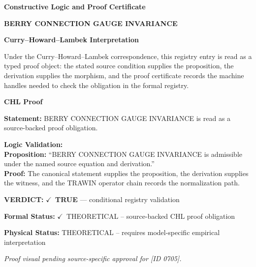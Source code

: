 \clearpage
\begingroup\tzpsupportsetup
\noindent\textbf{\fontsize{10.8pt}{12.8pt}\selectfont [ID 0705] Constructive Logic and Proof Certificate}\par
\noindent\textbf{\fontsize{10pt}{12pt}\selectfont BERRY CONNECTION GAUGE INVARIANCE}\par
\vspace{0.45em}
\begingroup
\footnotesize
\setlength{\parskip}{0.22em}
\setlength{\parindent}{0pt}
\noindent\textbf{Curry--Howard--Lambek Interpretation}\par
Under the Curry--Howard--Lambek correspondence, this registry entry is read as a typed proof
object: the stated source condition supplies the proposition, the derivation supplies the
morphism, and the proof certificate records the machine handles needed to check the obligation
in the formal registry.

\vspace{0.45em}
\noindent\textbf{CHL Proof}\par
\textbf{Statement:} BERRY CONNECTION GAUGE INVARIANCE is read as a source-backed proof obligation.

\textbf{Logic Validation:}\\
\textbf{Proposition:} ``BERRY CONNECTION GAUGE INVARIANCE is admissible under the named source equation and derivation.''\\
\textbf{Proof:} The canonical statement supplies the proposition, the derivation supplies the witness, and the TRAWIN operator chain records the normalization path.

\textbf{VERDICT:} \ensuremath{\checkmark}\ \textbf{TRUE} --- conditional registry validation

\textbf{Formal Status:} \ensuremath{\checkmark}\ THEORETICAL -- source-backed CHL proof obligation

\textbf{Physical Status:} THEORETICAL -- requires model-specific empirical interpretation
\par\vspace{0.45em}
\par
\vfill
\begingroup\footnotesize\itshape
Proof visual pending source-specific approval for [ID 0705].
\par\endgroup
\vfill
\endgroup
\endgroup
